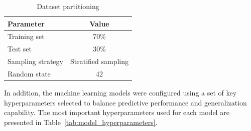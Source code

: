 \begin{table}[H]
\centering
\caption{Dataset partitioning}
\label{tab:data_split}
\begin{tabular}{|l|c|}
\hline
\textbf{Parameter} & \textbf{Value} \\
\hline
Training set & 70\% \\
\hline
Test set & 30\% \\
\hline
Sampling strategy & Stratified sampling \\
\hline
Random state & 42 \\
\hline
\end{tabular}
\end{table}

In addition, the machine learning models were configured using a set of key hyperparameters selected to balance predictive performance and generalization capability. The most important hyperparameters used for each model are presented in Table~\ref{tab:model_hyperparameters}.

